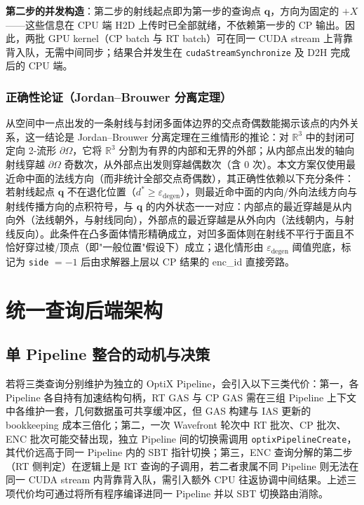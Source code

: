 \textbf{第二步的并发构造}：第二步的射线起点即为第一步的查询点 $\mathbf{q}$，方向为固定的 $+X$——这些信息在 CPU 端 H2D 上传时已全部就绪，不依赖第一步的 CP 输出。因此，两批 GPU kernel（CP batch 与 RT batch）可在同一 CUDA stream 上背靠背入队，无需中间同步；结果合并发生在 \texttt{cudaStreamSynchronize} 及 D2H 完成后的 CPU 端。

\subsubsection{正确性论证（Jordan--Brouwer 分离定理）}

从空间中一点出发的一条射线与封闭多面体边界的交点奇偶数能揭示该点的内外关系，这一结论是 Jordan--Brouwer 分离定理在三维情形的推论：对 $\mathbb{R}^3$ 中的封闭可定向 2-流形 $\partial\Omega$，它将 $\mathbb{R}^3$ 分割为有界的内部和无界的外部；从内部点出发的轴向射线穿越 $\partial\Omega$ 奇数次，从外部点出发则穿越偶数次（含 0 次）。本文方案仅使用最近命中面的法线方向（而非统计全部交点奇偶数），其正确性依赖以下充分条件：若射线起点 $\mathbf{q}$ 不在退化位置（$d^* \ge \varepsilon_{\text{degen}}$），则最近命中面的内向/外向法线方向与射线传播方向的点积符号，与 $\mathbf{q}$ 的内外状态一一对应：内部点的最近穿越是从内向外（法线朝外，与射线同向），外部点的最近穿越是从外向内（法线朝内，与射线反向）。此条件在凸多面体情形精确成立，对凹多面体则在射线不平行于面且不恰好穿过棱/顶点（即"一般位置"假设下）成立；退化情形由 $\varepsilon_{\text{degen}}$ 阈值兜底，标记为 \texttt{side} $= -1$ 后由求解器上层以 CP 结果的 enc\_id 直接旁路。

\section{统一查询后端架构}
\label{sec:optix_backend:unified_arch}

\subsection{单 Pipeline 整合的动机与决策}

若将三类查询分别维护为独立的 OptiX Pipeline，会引入以下三类代价：第一，各 Pipeline 各自持有加速结构句柄，RT GAS 与 CP GAS 需在三组 Pipeline 上下文中各维护一套，几何数据虽可共享缓冲区，但 GAS 构建与 IAS 更新的 bookkeeping 成本三倍化；第二，一次 Wavefront 轮次中 RT 批次、CP 批次、ENC 批次可能交替出现，独立 Pipeline 间的切换需调用 \texttt{optixPipelineCreate}，其代价远高于同一 Pipeline 内的 SBT 指针切换；第三，ENC 查询分解的第二步（RT 侧判定）在逻辑上是 RT 查询的子调用，若二者隶属不同 Pipeline 则无法在同一 CUDA stream 内背靠背入队，需引入额外 CPU 往返协调中间结果。上述三项代价均可通过将所有程序编译进同一 Pipeline 并以 SBT 切换路由消除。

